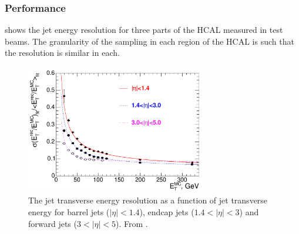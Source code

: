 \subsubsection{Performance}

 shows the jet energy resolution for three parts of
the {HCAL} measured in test beams. The granularity of the sampling in each
region of the HCAL is such that the resolution is similar in each.

\begin{figure}[htbp]
  \centering
  \includegraphics[width=0.7\textwidth]{hcal_performance}
  \caption[The jet transverse energy resolution as a function of jet transverse
energy.] {The jet transverse energy resolution as a function of jet transverse
energy for barrel jets ($|\eta| < 1.4$), endcap jets ($1.4<|\eta| < 3$) and
forward jets ($3<|\eta| < 5$). From \cite{chatrchyan2008cms}. }
  \label{fig:hcalperform}
\end{figure}

